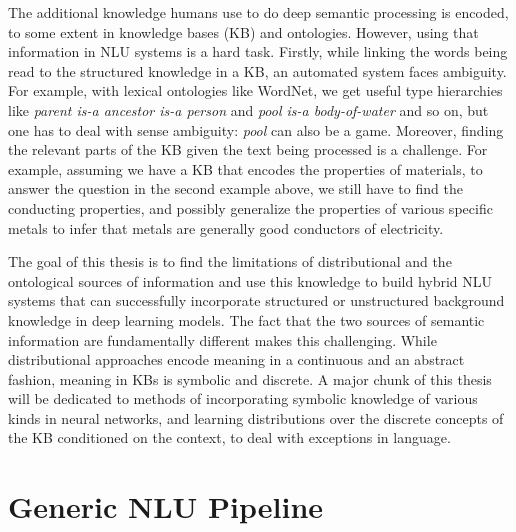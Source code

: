 The additional knowledge humans use to do deep semantic processing is encoded, to
some extent in knowledge bases (KB) and ontologies. However, using that information in NLU systems is a 
hard task. Firstly, while linking the words being read to the structured knowledge
in a KB, an automated system faces ambiguity. For example, with lexical ontologies like WordNet, 
we get useful type hierarchies like \textit{parent is-a ancestor is-a person} and \textit{pool is-a body-of-water} 
and so on, but one has to deal with sense ambiguity: \textit{pool} can also be a game. Moreover, finding the 
relevant parts of the KB given the text being processed is a challenge. For example, assuming we have a KB that encodes
the properties of materials, to answer the question in the second example above, we still have to 
find the conducting properties, and possibly generalize the properties of various specific metals to
infer that metals are generally good conductors of electricity.

The goal of this thesis is to find the limitations of distributional and the ontological 
sources of information and use this knowledge to build hybrid NLU systems that can successfully 
incorporate structured or unstructured background knowledge in deep learning models. The fact
that the two sources of semantic information are fundamentally different 
makes this challenging. While distributional approaches encode meaning in a
continuous and an abstract fashion, meaning in KBs is symbolic and discrete. 
A major chunk of this thesis will be dedicated to methods of incorporating
symbolic knowledge of various kinds in neural networks, and learning 
distributions over the discrete concepts of the KB conditioned on the context,
to deal with exceptions in language.

\section{Generic NLU Pipeline}


